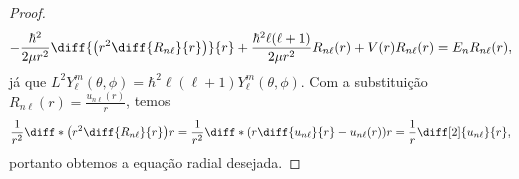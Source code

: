 \begin{proof}
    \begin{equation*}
        -\frac{\hbar^2}{2\mu r^2}\diff{\left(r^2 \diff{R_{n\ell}}{r}\right)}{r} + \frac{\hbar^2\ell(\ell + 1)}{2\mu r^2}R_{n\ell}(r) + V(r) R_{n\ell}(r) = E_n R_{n\ell}(r),
    \end{equation*}
    já que \(L^2Y_\ell^m(\theta,\phi) = \hbar^2 \ell (\ell + 1) Y_{\ell}^m(\theta, \phi)\). Com a substituição \(R_{n\ell}(r) = \frac{u_{n\ell}(r)}{r}\), temos
    \begin{equation*}
        \frac{1}{r^2}\diff*{\left(r^2 \diff{R_{n\ell}}{r}\right)}{r} = \frac{1}{r^2} \diff*{\left(r \diff{u_{n\ell}}{r} - u_{n\ell}(r)\right)}{r} = \frac{1}{r}\diff[2]{u_{n\ell}}{r},
    \end{equation*}
    portanto obtemos a equação radial desejada.
\end{proof}

